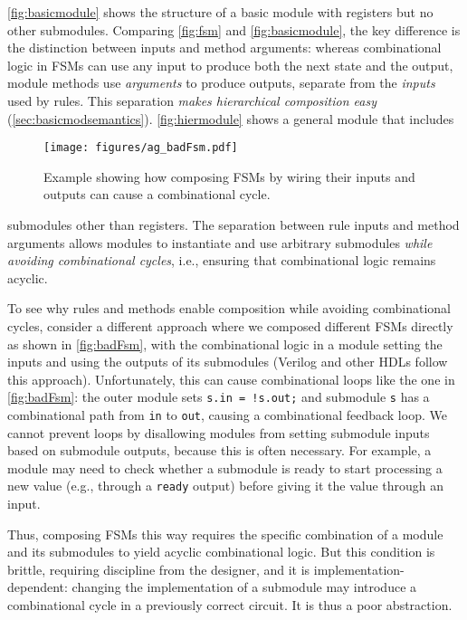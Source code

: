 \autoref{fig:basicmodule} shows the structure of a basic module with registers but no other submodules.
Comparing \autoref{fig:fsm} and \autoref{fig:basicmodule}, the key difference
is the distinction between inputs and method arguments: whereas combinational logic in FSMs
can use any input to produce both the next state and the output,
module methods use \emph{arguments} to produce outputs, separate from the \emph{inputs} used
by rules.
This separation \emph{makes hierarchical composition easy} (\autoref{sec:basicmodsemantics}).
\autoref{fig:hiermodule} shows a general module that includes
\begin{wrapfigure}{r}{0.33\columnwidth}
\vspace{-0.2em}
\centering
\texttt{[image: figures/ag\_badFsm.pdf]}
\caption{Example showing how composing FSMs by wiring their
        inputs and outputs can cause a combinational cycle.}
\label{fig:badFsm}
\vspace{-2.5em}
\end{wrapfigure}
submodules other than registers.
The separation between rule inputs and method arguments
allows modules to instantiate and use arbitrary submodules \emph{while avoiding combinational cycles},
i.e., ensuring that combinational logic remains acyclic.

To see why rules and methods enable composition while avoiding combinational cycles,
consider a different approach where we composed different FSMs directly as shown in \autoref{fig:badFsm},
with the combinational logic in a module setting the inputs and using the outputs of its submodules
(Verilog and other HDLs follow this approach).
Unfortunately, this can cause combinational loops like the one in \autoref{fig:badFsm}:
the outer module sets \verb|s.in = !s.out;| and submodule \verb|s| has a combinational path
from \verb|in| to \verb|out|, causing a combinational feedback loop.
We cannot prevent loops by disallowing modules from setting submodule inputs based on submodule outputs,
because this is often necessary. For example, a module may need to check whether a submodule is ready
to start processing a new value (e.g., through a \verb|ready| output) before giving it the value through an input.

Thus, composing FSMs this way requires the specific combination of a module and its submodules to yield acyclic combinational logic.
But this condition is brittle, requiring discipline from the designer, and it is implementation-dependent:
changing the implementation of a submodule may introduce a combinational cycle in a previously correct circuit.
It is thus a poor abstraction.

